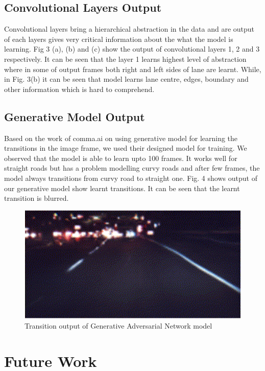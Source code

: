 \documentclass[a4paper,11pt,titlepage,drop]{article}%
\begin{document}
\subsection*{Convolutional Layers Output}

Convolutional layers bring a hierarchical abstraction in the data and are output of each layers gives very critical information about the what the model is learning. Fig 3 (a), (b) and (c) show the output of convolutional layers 1, 2 and 3 respectively. It can be seen that the layer 1 learns highest level of abstraction where in some of output frames both right and left sides of lane are learnt. While, in Fig. 3(b) it can be seen that model learns lane centre, edges, boundary and other information which is hard to comprehend.

\subsection*{Generative Model Output}

Based on the work of comma.ai on using generative model for learning the transitions in the image frame, we used their designed model for training. We observed that the model is able to learn upto 100 frames. It works well for straight roads but has a problem modelling curvy roads and after few frames, the model always transitions from curvy road to straight one. Fig. 4 shows output of our generative model show learnt transitions. It can be seen that the learnt transition is blurred.

\begin{figure}
    \center
    \includegraphics[width=\textwidth]{gan_out}
    \caption{Transition output of Generative Adversarial Network model}
    \label{fig:figure6}
\end{figure}  


\section{Future Work}
\end{document}
